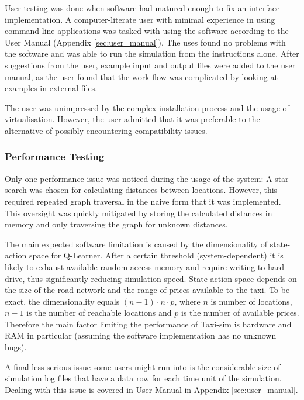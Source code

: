 User testing was done when software had matured enough to fix an interface
implementation. A computer-literate user with minimal experience in using
command-line applications was tasked with using the software according to the
User Manual (Appendix \ref{sec:user_manual}). The uses found no problems with
the software and was able to run the simulation from the instructions alone.
After suggestions from the user, example input and output files were added to
the user manual, as the user found that the work flow was complicated by looking
at examples in external files.

The user was unimpressed by the complex installation process and the usage of
virtualisation. However, the user admitted that it was preferable to the
alternative of possibly encountering compatibility issues.

\subsubsection{Performance Testing}
\label{sec:implementation:testing:performance}

Only one performance issue was noticed during the usage of the system: A-star
search was chosen for calculating distances between locations. However, this
required repeated graph traversal in the naive form that it was implemented.
This oversight was quickly mitigated by storing the calculated distances in
memory and only traversing the graph for unknown distances.

The main expected software limitation is caused by the dimensionality of state-
action space for Q-Learner. After a certain threshold (system-dependent) it is
likely to exhaust available random access memory and require writing to hard
drive, thus significantly reducing simulation speed. State-action space depends
on the size of the road network and the range of prices available to the taxi.
To be exact, the dimensionality equals \( (n-1) \cdot n \cdot p\), where \(n\)
is number of locations, \(n-1\) is the number of reachable locations and \(p\)
is the number of available prices. Therefore the main factor limiting the
performance of Taxi-sim is hardware and RAM in particular (assuming the
software implementation has no unknown bugs).

A final less serious issue some users might run into is the considerable
size of simulation log files that have a data row for each time unit of the
simulation. Dealing with this issue is covered in User Manual in Appendix \ref{sec:user_manual}.
